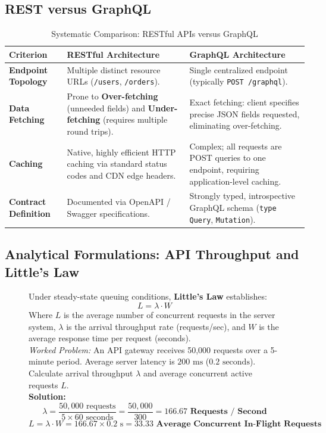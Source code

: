 \subsection{REST versus GraphQL}
\begin{table}[htbp]
\centering
\small
\caption{Systematic Comparison: RESTful APIs versus GraphQL}
\label{tab:rest_vs_graphql}
\begin{tabularx}{\textwidth}{l p{5cm} X}
\toprule
\textbf{Criterion} & \textbf{RESTful Architecture} & \textbf{GraphQL Architecture} \\
\midrule
\textbf{Endpoint Topology} & Multiple distinct resource URLs (\texttt{/users}, \texttt{/orders}). & Single centralized endpoint (typically \texttt{POST /graphql}). \\
\textbf{Data Fetching} & Prone to \textbf{Over-fetching} (unneeded fields) and \textbf{Under-fetching} (requires multiple round trips). & Exact fetching: client specifies precise JSON fields requested, eliminating over-fetching. \\
\textbf{Caching} & Native, highly efficient HTTP caching via standard status codes and CDN edge headers. & Complex; all requests are POST queries to one endpoint, requiring application-level caching. \\
\textbf{Contract Definition} & Documented via OpenAPI / Swagger specifications. & Strongly typed, introspective GraphQL schema (\texttt{type Query}, \texttt{Mutation}). \\
\bottomrule
\end{tabularx}
\end{table}

\subsection{Analytical Formulations: API Throughput and Little's Law}
\begin{figure}[htbp]
\centering
\begin{tcolorbox}[colback=codebg, colframe=primary, title=\textbf{Little's Law and API Queue Analysis}]
Under steady-state queuing conditions, \textbf{Little's Law} establishes:
\begin{equation}
\boxed{L = \lambda \cdot W}
\end{equation}
Where $L$ is the average number of concurrent requests in the server system, $\lambda$ is the arrival throughput rate (requests/sec), and $W$ is the average response time per request (seconds). \\
\textit{Worked Problem:} An API gateway receives 50,000 requests over a 5-minute period. Average server latency is $200\text{ ms}$ ($0.2\text{ seconds}$). Calculate arrival throughput $\lambda$ and average concurrent active requests $L$. \\
\textbf{Solution:}
\[
\lambda = \frac{50,000\text{ requests}}{5 \times 60\text{ seconds}} = \frac{50,000}{300} = \mathbf{166.67\text{ Requests / Second}}
\]
\[
L = \lambda \cdot W = 166.67 \times 0.2\text{ s} = \mathbf{33.33\text{ Average Concurrent In-Flight Requests}}
\]
\end{tcolorbox}
\end{figure}



